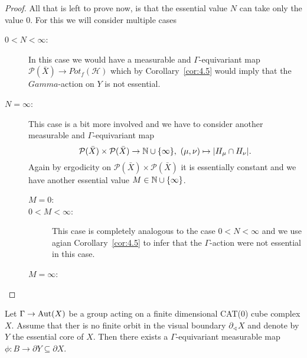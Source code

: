 \begin{proof}
  All that is left to prove now, is that the essential value \(N\) can take only the value \(0\). For this we will consider multiple cases
  \begin{description}
  \item[\(0 < N < \infty\):] In this case we would have a measurable and \(\Gamma\)-equivariant map \(\mathcal{P}(\bar X) \to Pot_f(\mathcal{H})\) which by Corollary~\ref{cor:4.5} would imply that the \(Gamma\)-action on \(Y\) is not essential.
  \item[\(N = \infty\):] This case is a bit more involved and we have to consider another measurable and \(\Gamma\)-equivariant map
    \[
      \mathcal{P}(\bar X) \times \mathcal{P}(\bar X) \to \mathbb{N} \cup \{\infty\},\ (\mu, \nu) \mapsto |H_\mu \cap H_\nu|.
    \]
    Again by ergodicity on \(\mathcal{P}(\bar X) \times \mathcal{P}(\bar X)\) it is essentially constant and we have another essential value \(M \in \mathbb{N} \cup \{\infty\}\).
    \begin{description}
    \item[\(M = 0\):] 
    \item[\(0 < M < \infty\):] This case is completely analogous to the case \(0 < N < \infty\) and we use agian Corollary~\ref{cor:4.5} to infer that the \(\Gamma\)-action were not essential in this case.
    \item[\(M = \infty\):] 
    \end{description}
  \end{description}

\end{proof}

\begin{cor}[\cite{MR3509968}]
  Let \(\Gamma \to \operatorname{Aut}(X)\) be a group acting on a finite dimensional CAT(0) cube complex \(X\). Assume that ther is no finite orbit in the visual boundary \(\partial_\sphericalangle X\) and denote by \(Y\) the essential core of \(X\). Then there exists a \(\Gamma\)-equivariant measurable map \(\phi \colon B \to \partial Y \subseteq \partial X\).
\end{cor}

